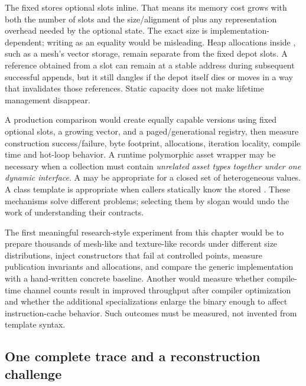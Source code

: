 The fixed  stores  optional slots inline. That means its memory cost grows with both the number of slots and the size/alignment of  plus any representation overhead needed by the optional state. The exact size is implementation-dependent; writing  as an equality would be misleading. Heap allocations inside , such as a mesh's vector storage, remain separate from the fixed depot slots. A reference obtained from a slot can remain at a stable address during subsequent successful appends, but it still dangles if the depot itself dies or moves in a way that invalidates those references. Static capacity does not make lifetime management disappear.

A production comparison would create equally capable versions using fixed optional slots, a growing vector, and a paged/generational registry, then measure construction success/failure, byte footprint, allocations, iteration locality, compile time and hot-loop behavior. A runtime polymorphic asset wrapper may be necessary when a collection must contain \emph{unrelated asset types together under one dynamic interface}. A  may be appropriate for a closed set of heterogeneous values. A class template is appropriate when callers statically know the stored . These mechanisms solve different problems; selecting them by slogan would undo the work of understanding their contracts.

The first meaningful research-style experiment from this chapter would be to prepare thousands of mesh-like and texture-like records under different size distributions, inject constructors that fail at controlled points, measure publication invariants and allocations, and compare the generic implementation with a hand-written concrete baseline. Another would measure whether compile-time channel counts result in improved throughput after compiler optimization and whether the additional specializations enlarge the binary enough to affect instruction-cache behavior. Such outcomes must be measured, not invented from template syntax.

\subsection{One complete trace and a reconstruction challenge}\label{05-engine-i-ch005-one-complete-trace-and-a-reconstruction-challenge}

